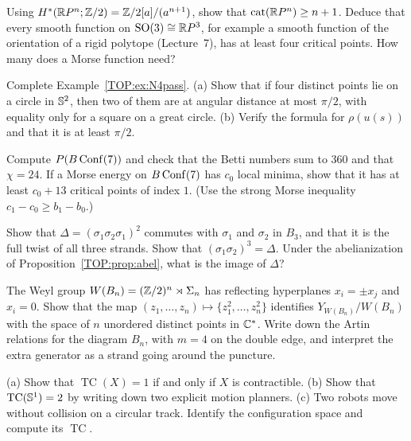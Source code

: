 \begin{exercise}
Using $H^*(\mathbb{R} P^n;\mathbb{Z}/2)=\mathbb{Z}/2[a]/(a^{n+1})$, show that $\operatorname{cat}(\mathbb{R} P^n)\ge n+1$. Deduce that every
smooth function on $\mathrm{SO}(3)\cong\mathbb{R} P^3$, for example a smooth function of the orientation of a rigid
polytope (Lecture~7), has at least four critical points. How many does a Morse function need?
\end{exercise}

\begin{exercise}\label{TOP:exc:N4}
Complete Example~\ref{TOP:ex:N4pass}. (a) Show that if four distinct points lie on a circle in $\mathbb{S}^2$, then
two of them are at angular distance at most $\pi/2$, with equality only for a square on a great circle.
(b) Verify the formula for $\rho(u(s))$ and that it is at least $\pi/2$.
\end{exercise}

\begin{exercise}
Compute $P(B\operatorname{Conf}(7))$ and check that the Betti numbers sum to $360$ and that $\chi=24$. If a Morse energy on
$B\operatorname{Conf}(7)$ has $c_0$ local minima, show that it has at least $c_0+13$ critical points of index $1$. (Use the
strong Morse inequality $c_1-c_0\ge b_1-b_0$.)
\end{exercise}

\begin{exercise}
Show that $\Delta=(\sigma_1\sigma_2\sigma_1)^2$ commutes with $\sigma_1$ and $\sigma_2$ in $B_3$, and that it
is the full twist of all three strands. Show that $(\sigma_1\sigma_2)^3=\Delta$. Under the abelianization of
Proposition~\ref{TOP:prop:abel}, what is the image of $\Delta$?
\end{exercise}

\begin{exercise}\label{TOP:exc:Bn}
The Weyl group $W(B_n)=(\mathbb{Z}/2)^n\rtimes\Sigma_n$ has reflecting hyperplanes $x_i=\pm x_j$ and $x_i=0$. Show
that the map $(z_1,\dots,z_n)\mapsto\{z_1^2,\dots,z_n^2\}$ identifies $Y_{W(B_n)}/W(B_n)$ with the space of
$n$ unordered distinct points in $\mathbb{C}^*$. Write down the Artin relations for the diagram $B_n$, with
$m=4$ on the double edge, and interpret the extra generator as a strand going around the puncture.
\end{exercise}

\begin{exercise}\label{TOP:exc:TC}
(a) Show that $\operatorname{TC}(X)=1$ if and only if $X$ is contractible. (b) Show that
$\operatorname{TC}(\mathbb{S}^1)=2$ by writing down two explicit motion planners. (c) Two robots move
without collision on a circular track. Identify the configuration space and compute its $\operatorname{TC}$.
\end{exercise}

